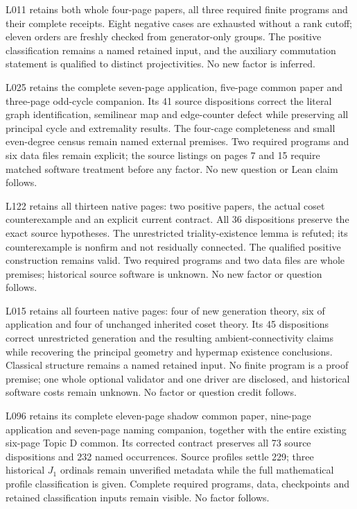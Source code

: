 \documentclass[11pt,a4paper]{article}
\begin{document}
L011 retains both whole four-page papers, all three required finite programs
and their complete receipts. Eight negative cases are exhausted without a rank
cutoff; eleven orders are freshly checked from generator-only groups. The positive
classification remains a named retained input, and the auxiliary commutation
statement is qualified to distinct projectivities. No new factor is inferred.

L025 retains the complete seven-page application, five-page common paper and
three-page odd-cycle companion. Its 41 source dispositions correct the literal
graph identification, semilinear map and edge-counter defect while preserving
all principal cycle and extremality results. The four-cage completeness and
small even-degree census remain named external premises. Two required programs
and six data files remain explicit; the source listings on pages 7 and 15 require
matched software treatment before any factor. No new question or Lean claim follows.

L122 retains all thirteen native pages: two positive papers, the actual coset
counterexample and an explicit current contract. All 36 dispositions preserve
the exact source hypotheses. The unrestricted triality-existence lemma is refuted;
its counterexample is nonfirm and not residually connected. The qualified positive
construction remains valid. Two required programs and two data files are whole
premises; historical source software is unknown. No new factor or question follows.

L015 retains all fourteen native pages: four of new generation theory, six of
application and four of unchanged inherited coset theory. Its 45 dispositions
correct unrestricted generation and the resulting ambient-connectivity claims
while recovering the principal geometry and hypermap existence conclusions.
Classical structure remains a named retained input. No finite program is a
proof premise; one whole optional validator and one driver are disclosed, and
historical software costs remain unknown. No factor or question credit follows.

L096 retains its complete eleven-page shadow common paper, nine-page
application and seven-page naming companion, together with the entire existing
six-page Topic D common. Its corrected contract preserves all 73 source
dispositions and 232 named occurrences. Source profiles settle 229; three
historical $J_1$ ordinals remain unverified metadata while the full mathematical
profile classification is given. Complete required programs, data, checkpoints
and retained classification inputs remain visible. No factor follows.
\end{document}
